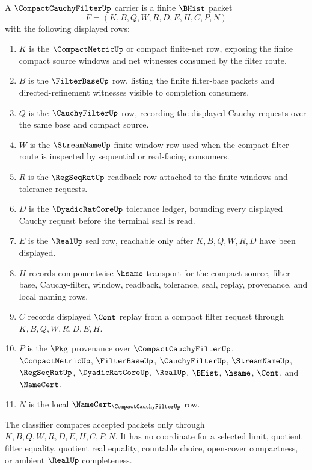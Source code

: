 \begin{definition}
\label{def:compact-cauchy-filter-carrier}
A $\CompactCauchyFilterUp$ carrier is a finite $\BHist$ packet
$$
F=(K,B,Q,W,R,D,E,H,C,P,N)
$$
with the following displayed rows:
\begin{enumerate}
\item $K$ is the $\CompactMetricUp$ or compact finite-net row, exposing the finite compact source windows and net witnesses consumed by the filter route.
\item $B$ is the $\FilterBaseUp$ row, listing the finite filter-base packets and directed-refinement witnesses visible to completion consumers.
\item $Q$ is the $\CauchyFilterUp$ row, recording the displayed Cauchy requests over the same base and compact source.
\item $W$ is the $\StreamNameUp$ finite-window row used when the compact filter route is inspected by sequential or real-facing consumers.
\item $R$ is the $\RegSeqRatUp$ readback row attached to the finite windows and tolerance requests.
\item $D$ is the $\DyadicRatCoreUp$ tolerance ledger, bounding every displayed Cauchy request before the terminal seal is read.
\item $E$ is the $\RealUp$ seal row, reachable only after $K,B,Q,W,R,D$ have been displayed.
\item $H$ records componentwise $\hsame$ transport for the compact-source, filter-base, Cauchy-filter, window, readback, tolerance, seal, replay, provenance, and local naming rows.
\item $C$ records displayed $\Cont$ replay from a compact filter request through $K,B,Q,W,R,D,E,H$.
\item $P$ is the $\Pkg$ provenance over $\CompactCauchyFilterUp$, $\CompactMetricUp$, $\FilterBaseUp$, $\CauchyFilterUp$, $\StreamNameUp$, $\RegSeqRatUp$, $\DyadicRatCoreUp$, $\RealUp$, $\BHist$, $\hsame$, $\Cont$, and $\NameCert$.
\item $N$ is the local $\NameCert_{\CompactCauchyFilterUp}$ row.
\end{enumerate}
The classifier compares accepted packets only through $K,B,Q,W,R,D,E,H,C,P,N$. It has no coordinate for a selected limit, quotient filter equality, quotient real equality, countable choice, open-cover compactness, or ambient $\RealUp$ completeness.
\end{definition}

